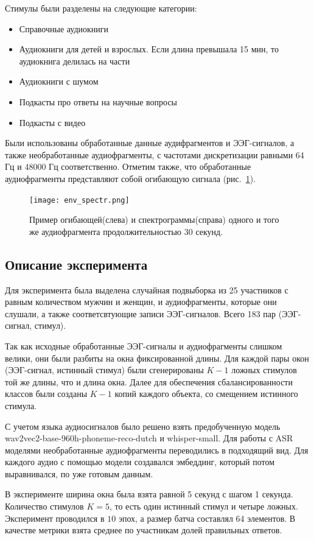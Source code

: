 \documentclass{article}
\begin{document}
    Стимулы были разделены на следующие категории:

    \begin{itemize}
        \item Справочные аудиокниги
        \item Аудиокниги для детей и взрослых. Если длина превышала 15 мин, то аудиокнига делилась на части
        \item Аудиокниги с шумом
        \item Подкасты про ответы на научные вопросы
        \item Подкасты с видео
    \end{itemize}

    Были использованы обработанные данные аудифрагментов и ЭЭГ-сигналов, а также необработанные аудиофрагменты, с частотами дискретизации равными  64 Гц и 48000 Гц соответственно. Отметим также, что обработанные аудиофрагменты представляют собой огибающую сигнала (рис.~\ref{envelope_spectr}).
    \begin{figure}[!h]
        \centering
        \texttt{[image: env\_spectr.png]}
        \caption{Пример огибающей(слева) и спектрограммы(справа) одного и того же аудиофрагмента продолжительностью 30 секунд.}
        \label{envelope_spectr}
    \end{figure}

    \subsection{Описание эксперимента}    
    Для эксперимента была выделена случайная подвыборка из 25 участников с равным количеством мужчин и женщин, и аудиофрагменты, которые они слушали, а также соответсвтующие записи ЭЭГ-сигналов. Всего 183 пар (ЭЭГ-сигнал, стимул). \par  
    Так как исходные обработанные ЭЭГ-сигналы и аудиофрагменты слишком велики, они были разбиты на окна фиксированной длины. Для каждой пары окон (ЭЭГ-сигнал, истинный стимул) были сгенерированы $K-1$ ложных стимулов той же длины, что и длина окна. Далее для обеспечения сбалансированности классов были созданы $K-1$ копий каждого объекта, со смещением истинного стимула. \par 
    С учетом языка аудиосигналов было решено взять предобученную модель wav2vec2-base-960h-phoneme-reco-dutch и whisper-small. Для работы с ASR моделями необработанные аудиофрагменты переводились в подходящий вид. Для каждого аудио с помощью модели создавался эмбеддинг, который потом выравнивался, по уже готовым данным. \par
    В эксперименте ширина окна была взята равной 5 секунд с шагом 1 секунда. Количество стимулов $K=5$, то есть один истинный стимул и четыре ложных. Эксперимент проводился в $10$ эпох, а размер батча составлял 64 элементов. В качестве метрики взята среднее по участникам долей правильных ответов. 
    
\end{document}
